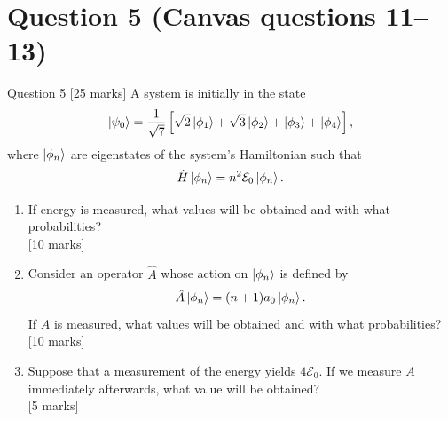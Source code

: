 \documentclass[12pt]{article}
\begin{document}
\section{Question 5 (Canvas questions 11--13)}
\begin{problembox}{Question 5 \hfill [25 marks]}
A system is initially in the state
\[
    \ket{\psi_0} = \frac{1}{\sqrt{7}}\left[\sqrt{2}\ket{\phi_1}
    + \sqrt{3}\ket{\phi_2}
    + \ket{\phi_3}
    + \ket{\phi_4} \right],
\]
where \(\ket{\phi_n}\) are eigenstates of the system's Hamiltonian such that
\[
    \hat{H}\ket{\phi_n} = n^2\mathcal{E}_0\ket{\phi_n}.
\]

\begin{enumerate}
    \item If energy is measured, what values will be obtained and with what probabilities? \\
     \phantom{add some invisible space}\hfill [10 marks]

    \item Consider an operator \(\hat{A}\) whose action on \(\ket{\phi_n}\) is defined by
    \[
        \hat{A}\ket{\phi_n} = (n+1)a_0\ket{\phi_n}.
    \]
    If \(A\) is measured, what values will be obtained and with what probabilities? \\
    \phantom{add some invisible space}\hfill [10 marks]

    \item Suppose that a measurement of the energy yields \(4\mathcal{E}_0\). If we measure \(A\) immediately afterwards, what value will be obtained? \\
    \phantom{add some invisible space}\hfill [5 marks]
\end{enumerate}
\end{problembox}
\end{document}
